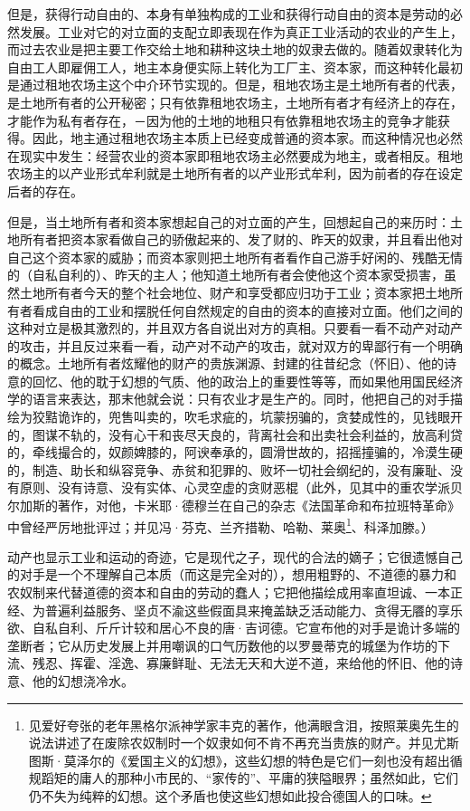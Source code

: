 \documentclass[a4paper,twoside,12pt]{ctexart}
\begin{document}
但是，获得行动自由的、本身有单独构成的工业和获得行动自由的资本是劳动的必然发展。工业对它的对立面的支配立即表现在作为真正工业活动的农业的产生上，而过去农业是把主要工作交给土地和耕种这块土地的奴隶去做的。随着奴隶转化为自由工人即雇佣工人，地主本身便实际上转化为工厂主、资本家，而这种转化最初是通过租地农场主这个中介环节实现的。但是，租地农场主是土地所有者的代表，是土地所有者的公开秘密；只有依靠租地农场主，土地所有者才有经济上的存在，才能作为私有者存在，－因为他的土地的地租只有依靠租地农场主的竞争才能获得。因此，地主通过租地农场主本质上已经变成普通的资本家。而这种情况也必然在现实中发生：经营农业的资本家即租地农场主必然要成为地主，或者相反。租地农场主的以产业形式牟利就是土地所有者的以产业形式牟利，因为前者的存在设定后者的存在。

但是，当土地所有者和资本家想起自己的对立面的产生，回想起自己的来历时：土地所有者把资本家看做自己的骄傲起来的、发了财的、昨天的奴隶，并且看出他对自己这个资本家的威胁；而资本家则把土地所有者看作自己游手好闲的、残酷无情的（自私自利的）、昨天的主人；他知道土地所有者会使他这个资本家受损害，虽然土地所有者今天的整个社会地位、财产和享受都应归功于工业；资本家把土地所有者看成自由的工业和摆脱任何自然规定的自由的资本的直接对立面。他们之间的这种对立是极其激烈的，并且双方各自说出对方的真相。只要看一看不动产对动产的攻击，并且反过来看一看，动产对不动产的攻击，就对双方的卑鄙行有一个明确的概念。土地所有者炫耀他的财产的贵族渊源、封建的往昔纪念（怀旧）、他的诗意的回忆、他的耽于幻想的气质、他的政治上的重要性等等，而如果他用国民经济学的语言来表达，那末他就会说：只有农业才是生产的。同时，他把自己的对手描绘为狡黠诡诈的，兜售叫卖的，吹毛求疵的，坑蒙拐骗的，贪婪成性的，见钱眼开的，图谋不轨的，没有心干和丧尽天良的，背离社会和出卖社会利益的，放高利贷的，牵线撮合的，奴颜婢膝的，阿谀奉承的，圆滑世故的，招摇撞骗的，冷漠生硬的，制造、助长和纵容竞争、赤贫和犯罪的、败坏一切社会纲纪的，没有廉耻、没有原则、没有诗意、没有实体、心灵空虚的贪财恶棍（此外，见其中的重农学派贝尔加斯的著作，对他，卡米耶·德穆兰在自己的杂志《法国革命和布拉班特革命》中曾经严厉地批评过；并见冯·芬克、兰齐措勒、哈勒、莱奥\footnote{见爱好夸张的老年黑格尔派神学家丰克的著作，他满眼含泪，按照莱奥先生的说法讲述了在废除农奴制时一个奴隶如何不肯不再充当贵族的财产。并见尤斯图斯·莫泽尔的《爱国主义的幻想》，这些幻想的特色是它们一刻也没有超出循规蹈矩的庸人的那种小市民的、“家传的”、平庸的狭隘眼界；虽然如此，它们仍不失为纯粹的幻想。这个矛盾也使这些幻想如此投合德国人的口味。}、科泽加滕。）

动产也显示工业和运动的奇迹，它是现代之子，现代的合法的嫡子；它很遗憾自己的对手是一个不理解自己本质（而这是完全对的），想用粗野的、不道德的暴力和农奴制来代替道德的资本和自由的劳动的蠢人；它把他描绘成用率直坦诚、一本正经、为普遍利益服务、坚贞不渝这些假面具来掩盖缺乏活动能力、贪得无餍的享乐欲、自私自利、斤斤计较和居心不良的唐·吉诃德。它宣布他的对手是诡计多端的垄断者；它从历史发展上并用嘲讽的口气历数他的以罗曼蒂克的城堡为作坊的下流、残忍、挥霍、淫逸、寡廉鲜耻、无法无天和大逆不道，来给他的怀旧、他的诗意、他的幻想浇冷水。
\end{document}

